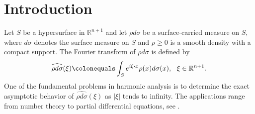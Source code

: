 \documentclass[a4paper, 11pt]{article}
\theoremstyle{plain}
\theoremstyle{definition}
\theoremstyle{lemma}
\theoremstyle{Remark}
\theoremstyle{proposition}
\theoremstyle{corollary}
\theoremstyle{example}
\theoremstyle{assumption}
\begin{document}
\section{Introduction}
Let $S$ be a hypersurface in $\mathbb{R}^{n+1}$ and let $\rho d\sigma$ be a surface-carried measure on $S,$ where $d\sigma$ denotes the surface measure on $S$ and $\rho\geq 0$ is a smooth density with a compact support. The Fourier transform of $\rho d\sigma$ is defined by
 \begin{equation*}
 \widehat{\rho d\sigma}(\xi)\colonequals \int_S e^{i\xi\cdot x}\rho(x) d\sigma(x),\,\,\,\,\xi\in \mathbb{R}^{n+1}.
\end{equation*}
 One of the fundamental problems  in harmonic analysis is to determine the exact asymptotic behavior of $\widehat{\rho d\sigma}(\xi)$ as  $|\xi|$ tends to infinity.  The applications range from number theory to  partial differential equations, see \cite{Stein, S.Sh}.
\end{document}
